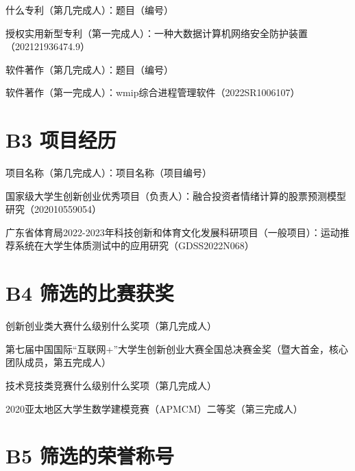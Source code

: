 \documentclass[14pt]{jnuthesis}
\begin{document}
\begin{enumerate}[{[}1{]}]
	\item 什么专利（第几完成人）：题目（编号）
	\item 授权实用新型专利（第一完成人）：一种大数据计算机网络安全防护装置（202121936474.9）
	\item 软件著作（第几完成人）：题目（编号）
	\item 软件著作（第一完成人）：wmip综合进程管理软件（2022SR1006107）
\end{enumerate}

\section*{B3 项目经历}

\begin{enumerate}[{[}1{]}]
	\item 项目名称（第几完成人）：项目名称（项目编号） %
	\item 国家级大学生创新创业优秀项目（负责人）：融合投资者情绪计算的股票预测模型研究（202010559054）
	\item 广东省体育局2022-2023年科技创新和体育文化发展科研项目（一般项目）：运动推荐系统在大学生体质测试中的应用研究（GDSS2022N068）
\end{enumerate}

\section*{B4 筛选的比赛获奖}

\begin{enumerate}[{[}1{]}]
	\item 创新创业类大赛什么级别什么奖项（第几完成人） %
	\item 第七届中国国际“互联网+”大学生创新创业大赛全国总决赛金奖（暨大首金，核心团队成员，第五完成人）
	\item 技术竞技类竞赛什么级别什么奖项（第几完成人） %
	\item 2020亚太地区大学生数学建模竞赛（APMCM）二等奖（第三完成人）
\end{enumerate}

\section*{B5 筛选的荣誉称号}
\end{document}
